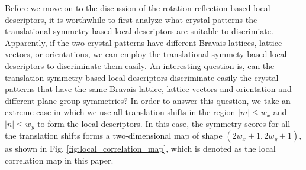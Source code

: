 \documentclass[twocolumn,amsmath, floatfix]{revtex4}
\begin{document}
Before we move on to the discussion of the rotation-reflection-based local descriptors, it is worthwhile to first analyze what crystal patterns the translational-symmetry-based local descriptors are suitable to discrimiate. Apparently, if the two crystal patterns have different Bravais lattices, lattice vectors, or orientations, we can employ the translational-symmety-based local descriptors to discriminate them easily. An interesting question is, can the translation-symmetry-based local descriptors discriminate easily the crystal patterns that have the same Bravais lattice, lattice vectors and orientation and different plane group symmetries? In order to answer this question, we take an extreme case in which we use all translation shifts in the region $ |m|\leq w_x$ and  $ |n|\leq w_y$ to form the local descriptors. In this case, the symmetry scores for all the translation shifts  forms a two-dimensional map of shape $(2w_x+1, 2w_y+1)$, as shown in Fig. \ref{fig:local_correlation_map}, which is denoted as the local correlation map in this paper. 
\end{document}
